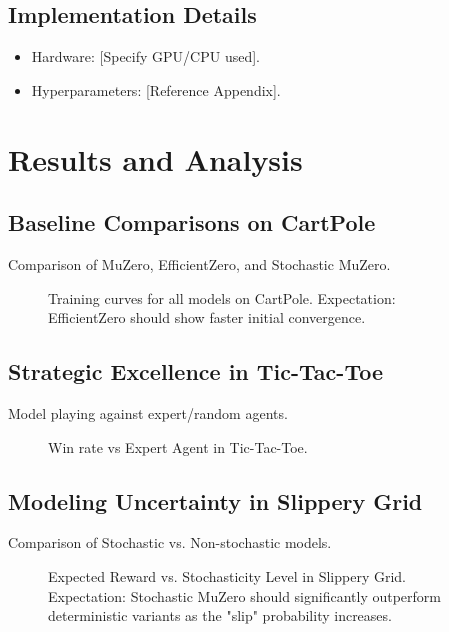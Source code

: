 \documentclass[twocolumn,10pt]{article}
\begin{document}
\subsection{Implementation Details}
\begin{itemize}
    \item Hardware: [Specify GPU/CPU used].
    \item Hyperparameters: [Reference Appendix].
\end{itemize}

\section{Results and Analysis}

\subsection{Baseline Comparisons on CartPole}
Comparison of MuZero, EfficientZero, and Stochastic MuZero.
\begin{figure}[h]
    \centering
    \caption{Training curves for all models on CartPole. Expectation: EfficientZero should show faster initial convergence.}
    \label{fig:cartpole}
\end{figure}

\subsection{Strategic Excellence in Tic-Tac-Toe}
Model playing against expert/random agents.
\begin{figure}[h]
    \centering
    \caption{Win rate vs Expert Agent in Tic-Tac-Toe.}
    \label{fig:tictactoe}
\end{figure}

\subsection{Modeling Uncertainty in Slippery Grid}
Comparison of Stochastic vs. Non-stochastic models.
\begin{figure}[h]
    \centering
    \caption{Expected Reward vs. Stochasticity Level in Slippery Grid. Expectation: Stochastic MuZero should significantly outperform deterministic variants as the "slip" probability increases.}
    \label{fig:grid}
\end{figure}
\end{document}
